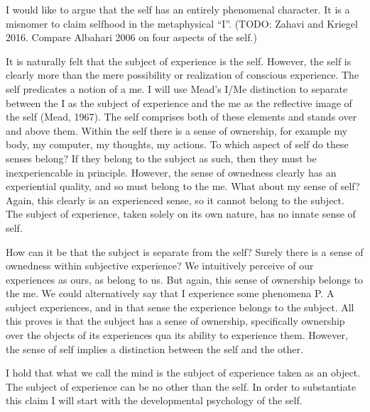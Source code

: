 \documentclass[leqno]{article}
\begin{document}
	I would like to argue that the self has an entirely phenomenal character. It is
	a misnomer to claim selfhood in the metaphysical “I”. (TODO: Zahavi and
	Kriegel 2016. Compare Albahari 2006 on four aspects of the self.)

	It is naturally felt that the subject of experience is the self. However, the self
	is clearly more than the mere possibility or realization of conscious experience.
	The self predicates a notion of a me. I will use Mead’s I/Me distinction to separate
	between the I as the subject of experience and the me as the reflective image of
	the self (Mead, 1967). The self comprises both of these elements and stands over
	and above them. Within the self there is a sense of ownership, for example my body,
	my computer, my thoughts, my actions. To which aspect of self do these senses belong?
	If they belong to the subject as such, then they must be inexperiencable in principle.
	However, the sense of ownedness clearly has an experiential quality, and so
	must belong to the me. What about my sense of self? Again, this clearly is an experienced
	sense, so it cannot belong to the subject. The subject of experience, taken
	solely on its own nature, has no innate sense of self.

	How can it be that the subject is separate from the self? Surely there is a
	sense of ownedness within subjective experience? We intuitively perceive of our
	experiences as ours, as belong to us. But again, this sense of ownership
	belongs to the me. We could alternatively say that I experience some phenomena
	P. A subject experiences, and in that sense the experience belongs to the subject.
	All this proves is that the subject has a sense of ownership, specifically ownership
	over the objects of its experiences qua its ability to experience them.
	However, the sense of self implies a distinction between the self and the other.

	I hold that what we call the mind is the subject of experience taken as an object.
	The subject of experience can be no other than the self. In order to substantiate
	this claim I will start with the developmental psychology of the self.
\end{document}
